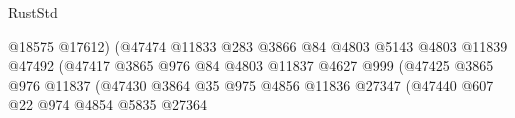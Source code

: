 \begin{lexlean}{RustStd}
\begin{coremodule}
                                                            @18575
                                                            @17612)
                                                          (@47474
                                                            @11833
                                                            @283
                                                            @3866
                                                            @84
                                                            @4803
                                                            @5143
                                                            @4803
                                                            @11839
                                                            @47492
                                                            (@47417
                                                              @3865
                                                              @976
                                                              @84
                                                              @4803
                                                              @11837
                                                              @4627
                                                              @999
                                                              (@47425
                                                                @3865
                                                                @976
                                                                @11837
                                                                (@47430
                                                                  @3864
                                                                  @35
                                                                  @975
                                                                  @4856
                                                                  @11836
                                                                  @27347
                                                                  (@47440
                                                                    @607
                                                                    @22
                                                                    @974
                                                                    @4854
                                                                    @5835
                                                                    @27364

\end{coremodule}
\end{lexlean}
